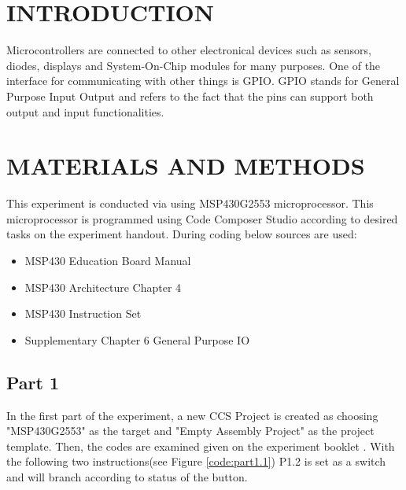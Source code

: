 \documentclass[pdftex,12pt,a4paper]{article}
\begin{document}
\section{INTRODUCTION}

Microcontrollers are connected to other electronical devices such as sensors, diodes, displays and System-On-Chip modules for many purposes. One of the interface for communicating with other things is GPIO. GPIO stands for General Purpose Input Output and refers to the fact that the pins can support both output and input functionalities.

\section{MATERIALS AND METHODS}

This experiment is conducted via using MSP430G2553 microprocessor. This microprocessor is programmed using Code Composer Studio according to desired tasks on the experiment handout. During coding below sources are used:

\begin{itemize}
    \item MSP430 Education Board Manual \cite{ref2}
    \item MSP430 Architecture Chapter 4 \cite{ref3}
    \item MSP430 Instruction Set \cite{ref4}
    \item Supplementary Chapter 6 General Purpose IO \cite{ref5}
\end{itemize}

\subsection{Part 1}

\newline{}
In the first part of the experiment, a new CCS Project is created as choosing "MSP430G2553" as the target and "Empty Assembly Project" as the project template. Then, the codes are examined given on the experiment booklet \cite{booklet}.
\newline{}
With the following two instructions(see Figure \ref{code:part1.1}) P1.2 is set as a switch and will branch according to status of the button.
\end{document}
